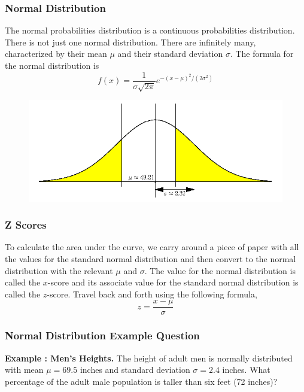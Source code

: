 \documentclass[xcolor=dvipsnames]{beamer}
\newcounter{expls}
\newcommand{\beispiel}[1]{\refstepcounter{expls}\textbf{Example \arabic{expls}: #1.}}
\begin{document}
\begin{frame}
  \frametitle{Normal Distribution}
  The normal probabilities distribution is a \alert{continuous}
  probabilities distribution. There is not just one normal
  distribution. There are infinitely many, characterized by their
  \alert{mean $\mu$} and their \alert{standard deviation $\sigma$}.
  The formula for the normal distribution is
  \begin{equation}
    \label{eq:aitoolah}
    f(x)=\frac{1}{\sigma\sqrt{2\pi}}e^{-(x-\mu)^{2}/(2\sigma^{2})}
  \end{equation}
  \begin{figure}[h]
    \includegraphics[scale=.4]{./qfour.png}
  \end{figure}
\end{frame}

\begin{frame}
  \frametitle{Z Scores}
  To calculate the area under the curve, we carry around a piece of
  paper with all the values for the \alert{standard normal
    distribution} and then convert to the normal distribution with the
  relevant $\mu$ and $\sigma$. The value for the normal distribution
  is called the \alert{$x$-score} and its associate value for the
  standard normal distribution is called the \alert{$z$-score}. Travel
  back and forth using the following formula,
  \begin{equation}
    \label{eq:uotoogoo}
    z=\frac{x-\mu}{\sigma}
  \end{equation}
\end{frame}

\begin{frame}
  \frametitle{Normal Distribution Example Question}
  \beispiel{Men's Heights} The height of adult men is normally
  distributed with mean $\mu=69.5$ inches and standard deviation
  $\sigma=2.4$ inches. What percentage of the adult male population is
  taller than six feet (72 inches)? 
\end{frame}
\end{document}
